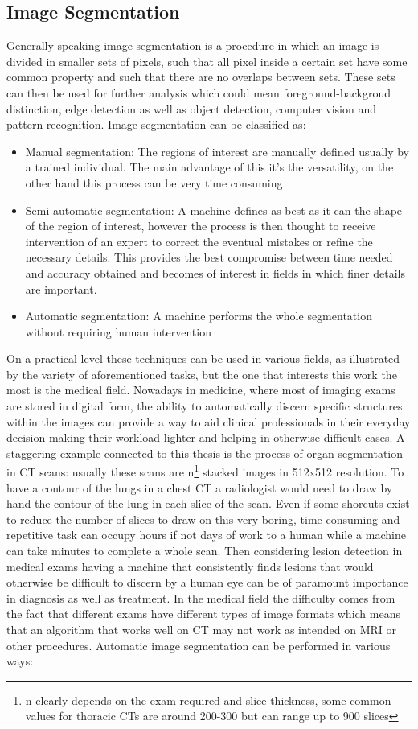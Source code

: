 \subsection{Image Segmentation}
Generally speaking image segmentation is a procedure in which an image is divided in smaller sets of pixels, such that all pixel inside a certain set have some common property and such that there are no overlaps between sets. These sets can then be used for further analysis which could mean foreground-backgroud distinction, edge detection as well as object detection, computer vision and pattern recognition. Image segmentation can be classified as:

\begin{itemize}
\item Manual segmentation: The regions of interest are manually defined usually by a trained individual. The main advantage of this it's the versatility, on the other hand this process can be very time consuming
\item Semi-automatic segmentation: A machine defines as best as it can the shape of the region of interest, however the process is then thought to receive intervention of an expert to correct the eventual mistakes or refine the necessary details. This provides the best compromise between time needed and accuracy obtained and becomes of interest in fields in which finer details are important.
\item Automatic segmentation: A machine performs the whole segmentation without requiring human intervention
\end{itemize}

On a practical level these techniques can be used in various fields, as illustrated by the variety of aforementioned tasks, but the one that interests this work the most is the medical field.
Nowadays in medicine, where most of imaging exams are stored in digital form, the ability to automatically discern specific structures within the images can provide a way to aid clinical professionals in their everyday decision making their workload lighter and helping in otherwise difficult cases.
A staggering example connected to this thesis is the process of organ segmentation in CT scans: usually these scans are n\footnote{n clearly depends on the exam required and slice thickness, some common values for thoracic CTs are around 200-300 but can range up to 900 slices} stacked images in 512x512 resolution. To have a contour of the lungs in a chest CT a radiologist would need to draw by hand the contour of the lung in each slice of the scan. Even if some shorcuts exist to reduce the number of slices to draw on this very boring, time consuming and repetitive task can occupy hours if not days of work to a human  while a machine can take minutes to complete a whole scan. Then considering lesion detection in medical exams having a machine that consistently finds lesions that would otherwise be difficult to discern by a human eye can be of paramount importance in diagnosis as well as treatment.
In the medical field the difficulty comes from the fact that different exams have different types of image formats which means that an algorithm that works well on CT may not work as intended on MRI or other procedures.
Automatic image segmentation can be performed in various ways:

